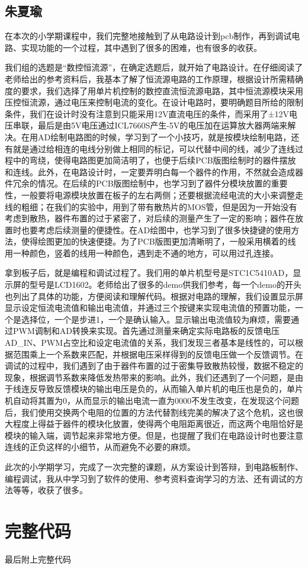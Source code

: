 \documentclass{../source/zjureport}
\begin{document}
        \subsection{朱夏瑜}
        在本次的小学期课程中，我们完整地接触到了从电路设计到pcb制作，再到调试电路、实现功能的一个过程，其中遇到了很多的困难，也有很多的收获。

        我们组的选题是“数控恒流源”，在确定选题后，就开始了电路设计。在仔细阅读了老师给出的参考资料后，我基本了解了恒流源电路的工作原理，根据设计所需精确度的要求，我们选择了用单片机控制的数控直流恒流源电路，其中恒流源模块采用压控恒流源，通过电压来控制电流的变化。在设计电路时，要明确题目所给的限制条件，我们在设计时没有注意到只能采用12V直流电压的条件，而采用了±12V电压串联，最后是由5V电压通过ICL7660S产生-5V的电压加在运算放大器两端来解决。在用AD绘制电路图的时候，学习到了一个小技巧，就是按模块绘制电路，还有就是通过给相连的电线分别做上相同的标记，可以代替中间的线，减少了连线过程中的弯绕，使得电路图更加简洁明了，也便于后续PCB版图绘制时的器件摆放和连线。此外，在电路设计时，一定要弄明白每一个器件的作用，不然就会造成器件冗余的情况。在后续的PCB版图绘制中，也学习到了器件分模块放置的重要性，一般要将电源模块放置在板子的左右两侧；还要根据流经电流的大小来调整走线的粗细；在我们的实验中，用到了带有散热片的MOS管，但是因为一开始没有考虑到散热，器件布置的过于紧密了，对后续的测量产生了一定的影响；器件在放置时也要考虑后续测量的便捷性。在AD绘图中，也学习到了很多快捷键的使用方法，使得绘图更加的快速便捷。为了PCB版图更加清晰明了，一般采用横着的线用一种颜色，竖着的线用一种颜色，遇到走不通的地方，可以用过孔连接。

        拿到板子后，就是编程和调试过程了。我们用的单片机型号是STC1C5410AD，显示屏的型号是LCD1602。老师给出了很多的demo供我们参考，每一个demo的开头也列出了具体的功能，方便阅读和理解代码。根据对电路的理解，我们设置显示屏显示设定恒流电流值和输出电流值，并通过三个按键来实现电流值的预置功能，一个是选择位，一个是步进1，一个是确认输入。显示输出电流值较为麻烦，需要通过PWM调制和AD转换来实现。首先通过测量来确定实际电路板的反馈电压AD_IN、PWM占空比和设定电流值的关系，我们发现三者基本是线性的，可以根据范围乘上一个系数来匹配，并根据电压采样得到的反馈电压做一个反馈调节。在调试的过程中，我们遇到了由于器件布置的过于密集导致散热较慢，数据不稳定的现象，根据调节系数来降低发热带来的影响。此外，我们还遇到了一个问题，是由于线连反导致反馈模块的输出电压是负的，从而输入单片机的电压也是负的，单片机自动将其置为0，从而显示的输出电流一直为0000不发生改变，在发现这个问题后，我们使用交换两个电阻的位置的方法代替割线完美的解决了这个危机，这也很大程度上得益于器件的模块化放置，使得两个电阻距离很近，而这两个电阻恰好是模块的输入端，调节起来非常地方便。但是，也提醒了我们在电路设计时也要注意连线的正负这样的小细节，从而避免不必要的麻烦。

        此次的小学期学习，完成了一次完整的课题，从方案设计到答辩，到电路板制作、编程调试，我从中学习到了软件的使用、参考资料查询学习的方法、还有调试的方法等等，收获了很多。

        \newpage
        \section{完整代码}
        最后附上完整代码
    
    \newpage
\end{document}
